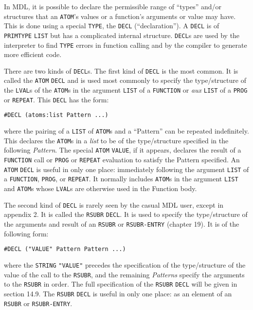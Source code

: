 \documentclass[a4paper]{scrbook}
\begin{document}
In MDL, it is possible to declare the permissible range of ``types'' and/or structures that an \texttt{ATOM}'s values or a
function's arguments or value may have. This is done using a special \texttt{TYPE}, the
\texttt{DECL} (``declaration''). A \texttt{DECL} is of \texttt{PRIMTYPE} \texttt{LIST} but has
a complicated internal structure. \texttt{DECL}s are used by the interpreter to find \texttt{TYPE} errors in function
calling and by the compiler to generate more efficient code.

There are two kinds of \texttt{DECL}s. The first kind of \texttt{DECL} is the most common. It is called the \texttt{ATOM}
\texttt{DECL} and is used most commonly to specify the type/structure of the \texttt{LVAL}s of the \texttt{ATOM}s in the
argument \texttt{LIST} of a \texttt{FUNCTION} or \emph{aux} \texttt{LIST} of a \texttt{PROG} or \texttt{REPEAT}. This
\texttt{DECL} has the form:

\begin{verbatim}
#DECL (atoms:list Pattern ...)
\end{verbatim}

where the pairing of a \texttt{LIST} of \texttt{ATOM}s and a ``Pattern'' can be repeated indefinitely. This declares the
\texttt{ATOM}s in a \emph{list} to be of the type/structure specified in the following \emph{Pattern}. The special
\texttt{ATOM} \texttt{VALUE}, if it appears, declares the result of a \texttt{FUNCTION} call
or \texttt{PROG} or \texttt{REPEAT} evaluation to satisfy the Pattern specified. An \texttt{ATOM} \texttt{DECL} is useful
in only one place: immediately following the argument \texttt{LIST} of a \texttt{FUNCTION}, \texttt{PROG}, or
\texttt{REPEAT}. It normally includes \texttt{ATOM}s in the argument \texttt{LIST} and \texttt{ATOM}s whose \texttt{LVAL}s
are otherwise used in the Function body.

The second kind of \texttt{DECL} is rarely seen by the casual MDL user, except in appendix 2. It is called the
\texttt{RSUBR} \texttt{DECL}. It is used to specify the type/structure of the arguments and result of an \texttt{RSUBR} or
\texttt{RSUBR-ENTRY} (chapter 19). It is of the following form:

\begin{verbatim}
#DECL ("VALUE" Pattern Pattern ...)
\end{verbatim}

where the \texttt{STRING} \texttt{"VALUE"} precedes the specification of the type/structure of the value of the call to the
\texttt{RSUBR}, and the remaining \emph{Patterns} specify the arguments to the \texttt{RSUBR} in order. The full
specification of the \texttt{RSUBR} \texttt{DECL} will be given in section 14.9. The \texttt{RSUBR} \texttt{DECL} is useful
in only one place: as an element of an \texttt{RSUBR} or \texttt{RSUBR-ENTRY}.
\end{document}
